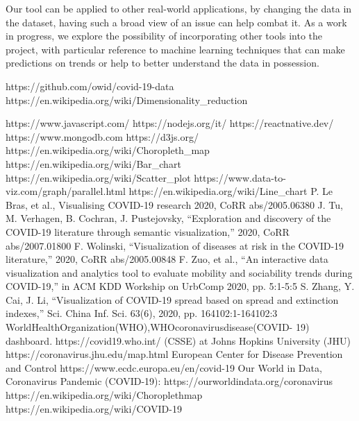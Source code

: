 \documentclass[10pt,conference]{IEEEtran}
\begin{document}
Our tool can be applied to other real-world applications, by changing the data in the dataset, having such a broad view of an issue can help combat it. As a work in progress, we explore the possibility of incorporating other tools into the project, with particular reference to machine learning techniques that can make predictions on trends or help to better understand the data in possession.


\begin{thebibliography}{00}

 https://github.com/owid/covid-19-data
 https://en.wikipedia.org/wiki/Dimensionality\_reduction

 https://www.javascript.com/
 https://nodejs.org/it/
 https://reactnative.dev/
 https://www.mongodb.com
 https://d3js.org/
 https://en.wikipedia.org/wiki/Choropleth\_map
 https://en.wikipedia.org/wiki/Bar\_chart
 https://en.wikipedia.org/wiki/Scatter\_plot
 https://www.data-to-viz.com/graph/parallel.html
 https://en.wikipedia.org/wiki/Line\_chart
 P. Le Bras, et al., Visualising COVID-19 research 2020, CoRR abs/2005.06380
 J. Tu, M. Verhagen, B. Cochran, J. Pustejovsky, “Exploration and discovery of the COVID-19 literature through semantic visualization,” 2020, CoRR abs/2007.01800
 F. Wolinski, “Visualization of diseases at risk in the COVID-19 literature,” 2020, CoRR abs/2005.00848
 F. Zuo, et al., “An interactive data visualization and analytics tool to evaluate mobility and sociability trends during COVID-19,” in ACM KDD Workship on UrbComp 2020, pp. 5:1-5:5
 S. Zhang, Y. Cai, J. Li, “Visualization of COVID-19 spread based on spread and extinction indexes,” Sci. China Inf. Sci. 63(6), 2020, pp. 164102:1-164102:3
 WorldHealthOrganization(WHO),WHOcoronavirusdisease(COVID- 19) dashboard. https://covid19.who.int/
 (CSSE) at Johns Hopkins University (JHU) https://coronavirus.jhu.edu/map.html
 European Center for Disease Prevention and Control https://www.ecdc.europa.eu/en/covid-19
 Our World in Data, Coronavirus Pandemic (COVID-19): https://ourworldindata.org/coronavirus 
 https://en.wikipedia.org/wiki/Choroplethmap
 https://en.wikipedia.org/wiki/COVID-19

\end{thebibliography}
\end{document}
